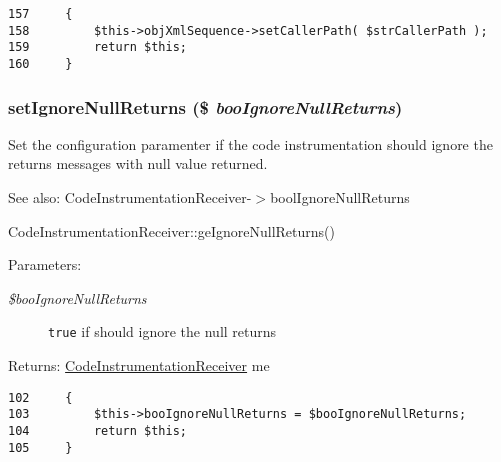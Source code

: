 \begin{Code}\begin{verbatim}157     {
158         $this->objXmlSequence->setCallerPath( $strCallerPath );
159         return $this;
160     }
\end{verbatim}
\end{Code}


\hypertarget{class_code_instrumentation_receiver_57b10b692e4fa48f22b1586376108f1b}{
\subsubsection[{setIgnoreNullReturns}]{\setlength{\rightskip}{0pt plus 5cm}setIgnoreNullReturns (\$ {\em booIgnoreNullReturns})}}
\label{class_code_instrumentation_receiver_57b10b692e4fa48f22b1586376108f1b}


Set the configuration paramenter if the code instrumentation should ignore the returns messages with null value returned.

\begin{Desc}
\item[See also:]CodeInstrumentationReceiver-$>$boolIgnoreNullReturns 

CodeInstrumentationReceiver::geIgnoreNullReturns() \end{Desc}
\begin{Desc}
\item[Parameters:]
\begin{description}
\item[{\em \$booIgnoreNullReturns}]{\tt true} if should ignore the null returns \end{description}
\end{Desc}
\begin{Desc}
\item[Returns:]\hyperlink{class_code_instrumentation_receiver}{CodeInstrumentationReceiver} me \end{Desc}


\begin{Code}\begin{verbatim}102     {
103         $this->booIgnoreNullReturns = $booIgnoreNullReturns;
104         return $this;
105     }
\end{verbatim}
\end{Code}


